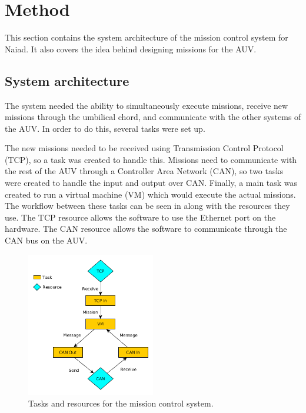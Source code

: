 \section{Method}\label{sec:method}
This section contains the system architecture of the mission control system for Naiad. It also covers the idea behind designing missions for the AUV.

\subsection{System architecture}
The system needed the ability to simultaneously execute missions, receive new missions through the umbilical chord, and communicate with the other systems of the AUV. In order to do this, several tasks were set up.


The new missions needed to be received using Transmission Control Protocol (TCP), so a task was created to handle this. Missions need to communicate with the rest of the AUV through a Controller Area Network (CAN), so two tasks were created to handle the input and output over CAN. Finally, a main task was created to run a virtual machine (VM) which would execute the actual missions. The workflow between these tasks can be seen in  along with the resources they use. The TCP resource allows the software to use the Ethernet port on the hardware. The CAN resource allows the software to communicate through the CAN bus on the AUV.

\pageref{fig:data_flow_figure}
\begin{figure}[h]
    \includegraphics[width=0.5\textwidth]{./figure/figureTasksAndResources.png}
    \caption{Tasks and resources for the mission control system.}
    \label{fig:data_flow_figure}
\end{figure}

